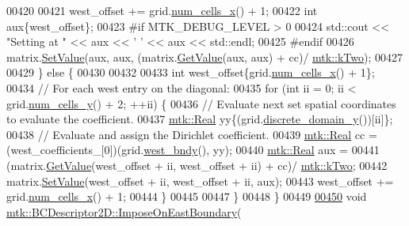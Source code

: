 \begin{DoxyCode}
00420 
00421     west\_offset += grid.\hyperlink{classmtk_1_1UniStgGrid2D_a2d182866a398aba8e4829590e85bf939}{num\_cells\_x}() + 1;
00422     \textcolor{keywordtype}{int} aux\{west\_offset\};
00423 \textcolor{preprocessor}{    #if MTK\_DEBUG\_LEVEL > 0}
00424     std::cout << \textcolor{stringliteral}{"Setting at "} << aux << \textcolor{charliteral}{' '} << aux << std::endl;
00425 \textcolor{preprocessor}{    #endif}
00426     matrix.\hyperlink{classmtk_1_1DenseMatrix_a784ce5784109ac86bfb9d8562b334b13}{SetValue}(aux, aux, (matrix.\hyperlink{classmtk_1_1DenseMatrix_a4b23ecbebd970b5eea915dbb50691024}{GetValue}(aux, aux) + cc)/
      \hyperlink{group__c01-roots_gaf39c2d851a2db744f4feb1c5ab3ec2cf}{mtk::kTwo});
00427 
00429   \} \textcolor{keywordflow}{else} \{
00430 
00432 
00433     \textcolor{keywordtype}{int} west\_offset\{grid.\hyperlink{classmtk_1_1UniStgGrid2D_a2d182866a398aba8e4829590e85bf939}{num\_cells\_x}() + 1\};
00434     \textcolor{comment}{// For each west entry on the diagonal:}
00435     \textcolor{keywordflow}{for} (\textcolor{keywordtype}{int} ii = 0; ii < grid.\hyperlink{classmtk_1_1UniStgGrid2D_aed05a801cc9a76dba0ff203cea58a61a}{num\_cells\_y}() + 2; ++ii) \{
00436       \textcolor{comment}{// Evaluate next set spatial coordinates to evaluate the coefficient.}
00437       \hyperlink{group__c01-roots_gac080bbbf5cbb5502c9f00405f894857d}{mtk::Real} yy\{(grid.\hyperlink{classmtk_1_1UniStgGrid2D_ac33a58d65105550dcf6f6b92b48b5105}{discrete\_domain\_y}())[ii]\};
00438       \textcolor{comment}{// Evaluate and assign the Dirichlet coefficient.}
00439       \hyperlink{group__c01-roots_gac080bbbf5cbb5502c9f00405f894857d}{mtk::Real} cc = (west\_coefficients\_[0])(grid.\hyperlink{classmtk_1_1UniStgGrid2D_af2b1712387ded85edaf2b64617d3fc13}{west\_bndy}(), yy);
00440       \hyperlink{group__c01-roots_gac080bbbf5cbb5502c9f00405f894857d}{mtk::Real} aux =
00441         (matrix.\hyperlink{classmtk_1_1DenseMatrix_a4b23ecbebd970b5eea915dbb50691024}{GetValue}(west\_offset + ii, west\_offset + ii) + cc)/
      \hyperlink{group__c01-roots_gaf39c2d851a2db744f4feb1c5ab3ec2cf}{mtk::kTwo};
00442       matrix.\hyperlink{classmtk_1_1DenseMatrix_a784ce5784109ac86bfb9d8562b334b13}{SetValue}(west\_offset + ii, west\_offset + ii, aux);
00443       west\_offset += grid.\hyperlink{classmtk_1_1UniStgGrid2D_a2d182866a398aba8e4829590e85bf939}{num\_cells\_x}() + 1;
00444     \}
00445 
00447   \}
00448 \}
00449 
\hypertarget{mtk__bc__descriptor__2d_8cc_source_l00450}{}\hyperlink{classmtk_1_1BCDescriptor2D_a3cf921884f08bf2eb87af6db7cc1ecba}{00450} \textcolor{keywordtype}{void} \hyperlink{classmtk_1_1BCDescriptor2D_a3cf921884f08bf2eb87af6db7cc1ecba}{mtk::BCDescriptor2D::ImposeOnEastBoundary}(

\end{DoxyCode}
